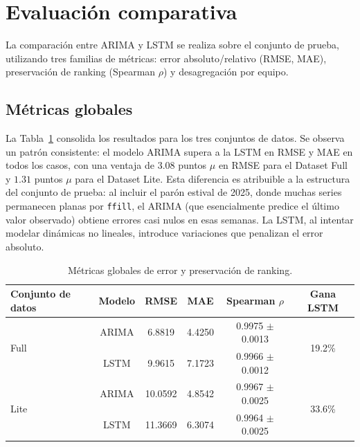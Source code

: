 \section{Evaluaci\'on comparativa}
\label{ap:evaluacion_comparativa}

La comparaci\'on entre ARIMA y LSTM se realiza sobre el conjunto de prueba, utilizando tres familias de m\'etricas: error absoluto/relativo (RMSE, MAE), preservaci\'on de ranking (Spearman \(\rho\)) y desagregaci\'on por equipo.

\subsection{M\'etricas globales}

La Tabla~\ref{tab:metricas_globales} consolida los resultados para los tres conjuntos de datos. Se observa un patr\'on consistente: el modelo ARIMA supera a la LSTM en RMSE y MAE en todos los casos, con una ventaja de $3{.}08$ puntos $\mu$ en RMSE para el Dataset Full y $1{.}31$ puntos $\mu$ para el Dataset Lite. Esta diferencia es atribuible a la estructura del conjunto de prueba: al incluir el par\'on estival de 2025, donde muchas series permanecen planas por \texttt{ffill}, el ARIMA (que esencialmente predice el \'ultimo valor observado) obtiene errores casi nulos en esas semanas. La LSTM, al intentar modelar din\'amicas no lineales, introduce variaciones que penalizan el error absoluto.

\begin{table}[htbp]
	\centering
	\caption{M\'etricas globales de error y preservaci\'on de ranking.}
	\label{tab:metricas_globales}
	\begin{tabular}{lccccc}
		\toprule
		\textbf{Conjunto de datos} & \textbf{Modelo} & \textbf{RMSE} & \textbf{MAE} & \textbf{Spearman \(\rho\)} & \textbf{Gana LSTM} \\
		\midrule
		\multirow{2}{*}{Full} & ARIMA & 6.8819 & 4.4250 & 0.9975 \(\pm\) 0.0013 & \multirow{2}{*}{19.2\%} \\
		& LSTM  & 9.9615 & 7.1723 & 0.9966 \(\pm\) 0.0012 & \\
		\midrule
		\multirow{2}{*}{Lite} & ARIMA & 10.0592 & 4.8542 & 0.9967 \(\pm\) 0.0025 & \multirow{2}{*}{33.6\%} \\
		& LSTM  & 11.3669 & 6.3074 & 0.9964 \(\pm\) 0.0025 & \\
		\bottomrule
	\end{tabular}
\end{table}


